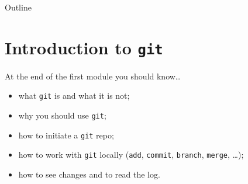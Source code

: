 \documentclass[aspectratio=169]{beamer}
\title{\code{git-intro}}
\subtitle{Introduction to version control, collaborative coding, and continuous integration}
\author{Dieter Werthmüller}
\newcommand{\ato}{\addtocounter{framenumber}{1}}
\newcommand{\code}[1]{\texttt{\color{mygreen}#1}}
\begin{document}

\ato %
\maketitle

\begin{frame}
  {Outline}
  \tableofcontents
\end{frame}

\ato %
\section{Introduction to \code{git}}

\begin{frame}
  {At the end of the first module you should know\ldots}
  \begin{itemize}\itemsep0.5cm
    \item what \code{git} is and what it is not;
    \item why you should use \code{git};
    \item how to initiate a \code{git} repo;
    \item how to work with \code{git} locally (\code{add}, \code{commit},
      \code{branch}, \code{merge}, \ldots);
    \item how to see changes and to read the log.
  \end{itemize}
\end{frame}
\end{document}
